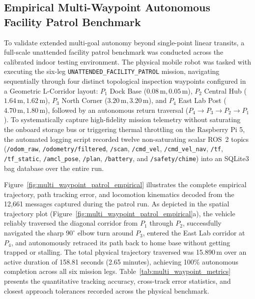 \subsection{Empirical Multi-Waypoint Autonomous Facility Patrol Benchmark}
\label{sec:multi_waypoint_evaluation}
To validate extended multi-goal autonomy beyond single-point linear transits, a full-scale unattended facility patrol benchmark was conducted across the calibrated indoor testing environment. The physical mobile robot was tasked with executing the six-leg \texttt{UNATTENDED\_FACILITY\_PATROL} mission, navigating sequentially through four distinct topological inspection waypoints configured in a Geometric L-Corridor layout: $P_1$ Dock Base ($0.08\,\text{m}, 0.05\,\text{m}$), $P_2$ Central Hub ($1.64\,\text{m}, 1.62\,\text{m}$), $P_3$ North Corner ($3.20\,\text{m}, 3.20\,\text{m}$), and $P_4$ East Lab Post ($4.70\,\text{m}, 1.80\,\text{m}$), followed by an autonomous return traversal ($P_4 \to P_3 \to P_2 \to P_1$). To systematically capture high-fidelity mission telemetry without saturating the onboard storage bus or triggering thermal throttling on the Raspberry Pi 5, the automated logging script recorded twelve non-saturating scalar ROS~2 topics (\texttt{/odom\_raw}, \texttt{/odometry/filtered}, \texttt{/scan}, \texttt{/cmd\_vel}, \texttt{/cmd\_vel\_nav}, \texttt{/tf}, \texttt{/tf\_static}, \texttt{/amcl\_pose}, \texttt{/plan}, \texttt{/battery}, and \texttt{/safety/chime}) into an SQLite3 bag database over the entire run.

Figure~\ref{fig:multi_waypoint_patrol_empirical} illustrates the complete empirical trajectory, path tracking error, and locomotion kinematics decoded from the 12,661 messages captured during the patrol run. As depicted in the spatial trajectory plot (Figure~\ref{fig:multi_waypoint_patrol_empirical}a), the vehicle reliably traversed the diagonal corridor from $P_1$ through $P_2$, successfully navigated the sharp $90^\circ$ elbow turn around $P_3$, entered the East Lab corridor at $P_4$, and autonomously retraced its path back to home base without getting trapped or stalling. The total physical trajectory traversed was 15.890\,m over an active duration of 158.81 seconds (2.65 minutes), achieving 100\% autonomous completion across all six mission legs. Table~\ref{tab:multi_waypoint_metrics} presents the quantitative tracking accuracy, cross-track error statistics, and closest approach tolerances recorded across the physical benchmark.

